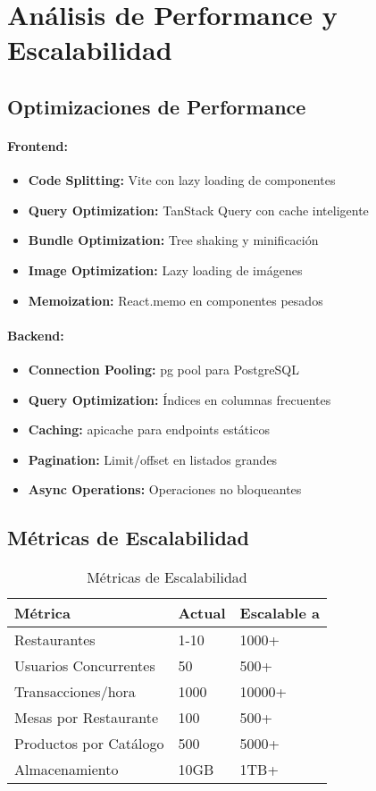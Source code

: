 \documentclass[12pt,a4paper]{article}
\begin{document}
\section{Análisis de Performance y Escalabilidad}

\subsection{Optimizaciones de Performance}

\paragraph{Frontend:}
\begin{itemize}
    \item \textbf{Code Splitting:} Vite con lazy loading de componentes
    \item \textbf{Query Optimization:} TanStack Query con cache inteligente
    \item \textbf{Bundle Optimization:} Tree shaking y minificación
    \item \textbf{Image Optimization:} Lazy loading de imágenes
    \item \textbf{Memoization:} React.memo en componentes pesados
\end{itemize}

\paragraph{Backend:}
\begin{itemize}
    \item \textbf{Connection Pooling:} pg pool para PostgreSQL
    \item \textbf{Query Optimization:} Índices en columnas frecuentes
    \item \textbf{Caching:} apicache para endpoints estáticos
    \item \textbf{Pagination:} Limit/offset en listados grandes
    \item \textbf{Async Operations:} Operaciones no bloqueantes
\end{itemize}

\subsection{Métricas de Escalabilidad}

\begin{table}[H]
\centering
\begin{tabular}{@{}lll@{}}
\toprule
\textbf{Métrica} & \textbf{Actual} & \textbf{Escalable a} \\
\midrule
Restaurantes & 1-10 & 1000+ \\
Usuarios Concurrentes & 50 & 500+ \\
Transacciones/hora & 1000 & 10000+ \\
Mesas por Restaurante & 100 & 500+ \\
Productos por Catálogo & 500 & 5000+ \\
Almacenamiento & 10GB & 1TB+ \\
\bottomrule
\end{tabular}
\caption{Métricas de Escalabilidad}
\end{table}
\end{document}
